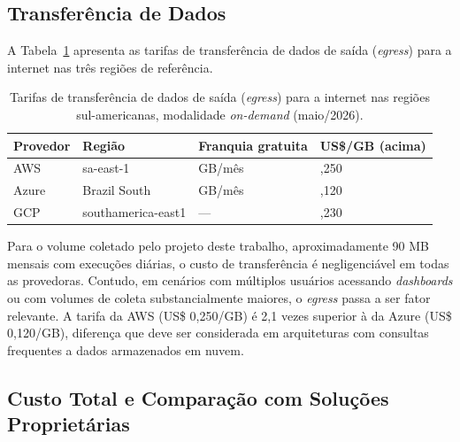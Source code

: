 \subsection{Transferência de Dados}

A Tabela~\ref{tab:custo_transferencia} apresenta as tarifas de transferência de
dados de saída (\textit{egress}) para a internet nas três regiões de referência.

\begin{table}[H]
    \centering
    \small
    \setlength{\extrarowheight}{3pt}
    \renewcommand{\arraystretch}{1.3}
    \begin{tabular}{
        >{\centering\arraybackslash}p{1.8cm}
        >{\raggedright\arraybackslash}p{4.0cm}
        >{\centering\arraybackslash}p{2.8cm}
        >{\centering\arraybackslash}p{2.8cm}
    }
        \toprule
        \textbf{Provedor} & \textbf{Região} &
        \textbf{Franquia gratuita} & \textbf{US\$/GB (acima)} \\
        \midrule
        \rowcolor[gray]{0.96}
        AWS   & sa-east-1            & 1 GB/mês   & 0,250 \\
        Azure & Brazil South         & 100 GB/mês & 0,120 \\
        \rowcolor[gray]{0.96}
        GCP   & southamerica-east1   & ---         & 0,230 \\
        \bottomrule
    \end{tabular}
    \caption{Tarifas de transferência de dados de saída (\textit{egress}) para a
    internet nas regiões sul-americanas, modalidade \textit{on-demand} (maio/2026).}
    \label{tab:custo_transferencia}
\end{table}

Para o volume coletado pelo projeto deste trabalho, aproximadamente 90 MB mensais com
execuções diárias, o custo de transferência é negligenciável em todas as
provedoras. Contudo, em cenários com múltiplos usuários acessando \textit{dashboards}
ou com volumes de coleta substancialmente maiores, o \textit{egress} passa a ser
fator relevante. A tarifa da AWS (US\$ 0,250/GB) é 2,1 vezes superior à da Azure
(US\$ 0,120/GB), diferença que deve ser considerada em arquiteturas com consultas
frequentes a dados armazenados em nuvem.

\subsection{Custo Total e Comparação com Soluções Proprietárias}


